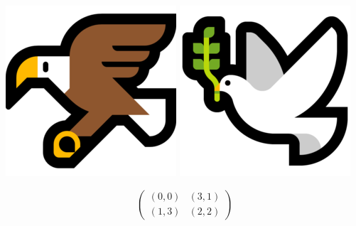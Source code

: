 \documentclass{beamer}
\begin{document}
\begin{frame}
    \begin{center}
    
    \end{center}
\end{frame}

\begin{frame}
    \begin{center}
    
    \end{center}
\end{frame}

\begin{frame}
    \centering
    \includegraphics[width=.2\textwidth]{static/hawk} \includegraphics[width=.2\textwidth]{static/dove}
\end{frame}

\begin{frame}
    \begin{center}
    \LARGE{
        \begin{equation*}
            \begin{pmatrix}
                (0, 0) & (3, 1)  \\
                (1, 3) & (2, 2)
            \end{pmatrix}
        \end{equation*}}
    \end{center}
\end{frame}

\begin{frame}
    \centering
    
\end{frame}

\begin{frame}
    \begin{center}
    
    \end{center}
\end{frame}
\end{document}
